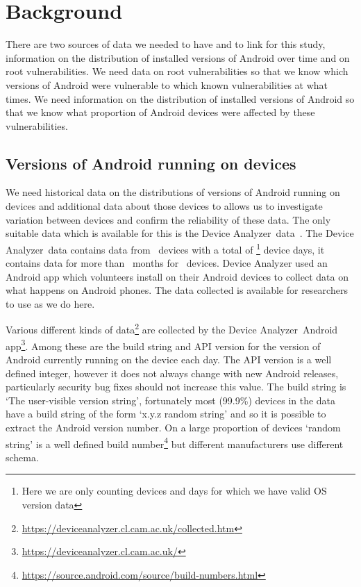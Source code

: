 \documentclass[conference,a4paper,twoside]{IEEEtran}
\let\OldTodo\todo
\renewcommand{\todo}{\OldTodo[inline]}
\newcommand{\todolater}[1]{}%
\newcommand{\da}{Device Analyzer}
\newcommand{\daNumDevices}{\daNumOSDevices}
\newcommand{\daDeviceDays}{\daOSTotalDaysData}
\begin{document}
\section{Background}
\label{sec:background}
There are two sources of data we needed to have and to link for this study, information on the distribution of installed versions of Android over time and on root vulnerabilities.
We need data on root vulnerabilities so that we know which versions of Android were vulnerable to which known vulnerabilities at what times.
We need information on the distribution of installed versions of Android so that we know what proportion of Android devices were affected by these vulnerabilities.


\subsection{Versions of Android running on devices}
We need historical data on the distributions of versions of Android running on devices and additional data about those devices to allows us to investigate variation between devices and confirm the reliability of these data.
The only suitable data which is available for this is the \da\ data~\cite{Wagner2013}.
The \da\ data contains data from \daNumDevices\ devices with a total of \daDeviceDays\footnote{Here we are only counting devices and days for which we have valid OS version data} device days, it contains data for more than \daMonths\ months for \daMonthsDevices\ devices.
Device Analyzer used an Android app which volunteers install on their Android devices to collect data on what happens on Android phones.
The data collected is available for researchers to use as we do here.

Various different kinds of data\footnote{\url{https://deviceanalyzer.cl.cam.ac.uk/collected.htm}} are collected by the \da\ Android app\footnote{\url{https://deviceanalyzer.cl.cam.ac.uk/}}.
Among these are the build string and API version for the version of Android currently running on the device each day.
The API version is a well defined integer, however it does not always change with new Android releases, particularly security bug fixes should not increase this value.
The build string is `The user-visible version string', fortunately most (99.9\%)\todolater{use a generated number} devices in the data have a build string of the form `x.y.z random string' and so it is possible to extract the Android version number.
On a large proportion of devices `random string' is a well defined build number\footnote{\url{https://source.android.com/source/build-numbers.html}} but different manufacturers use different schema.
\end{document}
